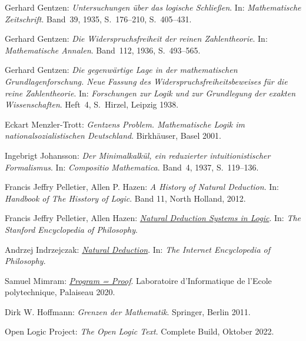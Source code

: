 
\begin{thebibliography}{00}

Gerhard Gentzen: \emph{Untersuchungen über das logische Schließen}.
In: \emph{Mathematische Zeitschrift}. Band~39, 1935, S.~176--210,
S.~405--431.

Gerhard Gentzen: \emph{Die Widerspruchsfreiheit der reinen
Zahlentheorie}. In: \emph{Mathematische Annalen}. Band~112,
1936, S.~493--565.

Gerhard Gentzen: \emph{Die gegenwärtige Lage in der mathematischen
Grundlagenforschung. Neue Fassung des Widerspruchsfreiheitsbeweises für
die reine Zahlentheorie}. In: \emph{Forschungen zur Logik und zur
Grundlegung der exakten Wissenschaften}. Heft~4, S.~Hirzel,
Leipzig 1938.

Eckart Menzler-Trott: \emph{Gentzens Problem. Mathematische Logik
im nationalsozialistischen Deutschland}. Birkhäuser, Basel 2001.

Ingebrigt Johansson: \emph{Der Minimalkalkül, ein reduzierter
intuitionistischer Formalismus}. In: \emph{Compositio Mathematica}.
Band~4, 1937, S.~119–136.

Francis Jeffry Pelletier, Allen P. Hazen: \emph{A History of Natural
Deduction}. In: \emph{Handbook of The Hisstory of Logic}.
Band 11, North Holland, 2012.

 Francis Jeffry Pelletier, Allen Hazen:
\href{https://plato.stanford.edu/entries/natural-deduction/}%
{\emph{Natural Deduction Systems in Logic}}.
In: \emph{The Stanford Encyclopedia of Philosophy}.

Andrzej Indrzejczak:
\href{https://iep.utm.edu/natural-deduction/}{\emph{Natural Deduction}}.
In: \emph{The Internet Encyclopedia of Philosophy}.

Samuel Mimram:
\emph{\href{https://www.lix.polytechnique.fr/Labo/Samuel.Mimram/publications/}%
{Program = Proof}}.
Laboratoire d'Informatique de l'Ecole polytechnique, Palaiseau 2020.

Dirk W. Hoffmann: \emph{Grenzen der Mathematik}.
Springer, Berlin 2011.

 Open Logic Project:
\emph{The Open Logic Text}. Complete Build, Oktober 2022.

\end{thebibliography}
